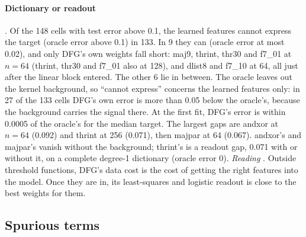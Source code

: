 \paragraph{Dictionary or readout} . Of the 148 cells with test error above 0.1, the learned features cannot express the target (oracle error above 0.1) in 133. In 9 they can (oracle error at most 0.02), and only DFG's own weights fall short: maj9, thrint, thr30 and f7\_01 at $n=64$ (thrint, thr30 and f7\_01 also at 128), and dlist8 and f7\_10 at 64, all just after the linear block entered. The other 6 lie in between. The oracle leaves out the kernel background, so ``cannot express'' concerns the learned features only: in 27 of the 133 cells DFG's own error is more than 0.05 below the oracle's, because the background carries the signal there. At the first fit, DFG's error is within 0.0005 of the oracle's for the median target. The largest gaps are andxor at $n=64$ (0.092) and thrint at 256 (0.071), then majpar at 64 (0.067). andxor's and majpar's vanish without the background; thrint's is a readout gap, 0.071 with or without it, on a complete degree-1 dictionary (oracle error 0). \emph{Reading} . Outside threshold functions, DFG's data cost is the cost of getting the right features into the model. Once they are in, its least-squares and logistic readout is close to the best weights for them.

\subsection{Spurious terms}\label{app:interp-spur}

